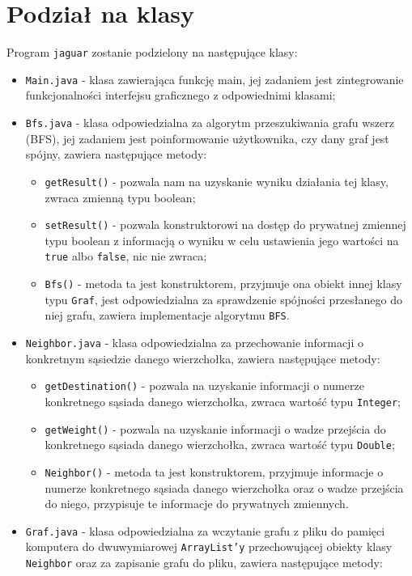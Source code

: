 \documentclass[]{article}
\begin{document}
\section{Podział na klasy}\label{header-n279}
Program \texttt{jaguar} zostanie podzielony na następujące klasy:
\begin{itemize}
\item
\texttt{Main.java} - klasa zawierająca funkcję main, jej zadaniem jest zintegrowanie funkcjonalności interfejsu graficznego z odpowiednimi klasami;
\item
\texttt{Bfs.java} -  klasa odpowiedzialna za algorytm przeszukiwania grafu wszerz (BFS), jej zadaniem jest poinformowanie użytkownika, czy dany graf jest spójny, zawiera następujące metody:
\begin{itemize}
\item
\texttt{getResult()} - pozwala nam na uzyskanie wyniku działania tej klasy, zwraca zmienną typu boolean;
\item
\texttt{setResult()} - pozwala konstruktorowi na dostęp do prywatnej zmiennej typu boolean z informacją o wyniku w celu ustawienia jego wartości na \texttt{true} albo \texttt{false}, nic nie zwraca;
\item
\texttt{Bfs()} - metoda ta jest konstruktorem, przyjmuje ona obiekt innej klasy typu \texttt{Graf}, jest odpowiedzialna za sprawdzenie spójności przesłanego do niej grafu, zawiera implementacje algorytmu \texttt{BFS}.
\end{itemize} 
\item
\texttt{Neighbor.java} - klasa odpowiedzialna za przechowanie informacji o konkretnym sąsiedzie danego wierzchołka, zawiera następujące metody:
\begin{itemize}
\item
\texttt{getDestination()} - pozwala na uzyskanie informacji o numerze konkretnego sąsiada danego wierzchołka, zwraca wartość typu \texttt{Integer};
\item
\texttt{getWeight()} - pozwala na uzyskanie informacji o wadze przejścia do konkretnego sąsiada danego wierzchołka, zwraca wartość typu \texttt{Double}; 
\item
\texttt{Neighbor()} - metoda ta jest konstruktorem, przyjmuje informacje o numerze konkretnego sąsiada danego wierzchołka oraz o wadze przejścia do niego, przypisuje te informacje do prywatnych zmiennych. 
\end{itemize}
\item
\texttt{Graf.java} - klasa odpowiedzialna za wczytanie grafu z pliku do pamięci komputera do dwuwymiarowej \texttt{ArrayList'y} przechowującej obiekty klasy \texttt{Neighbor} oraz za zapisanie grafu do pliku, zawiera następujące metody: 

\end{itemize}
\end{document}
